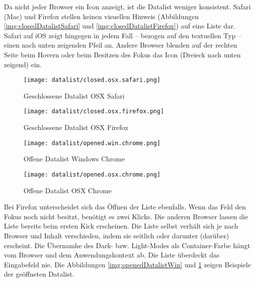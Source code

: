Da nicht jeder Browser ein Icon anzeigt, ist die Datalist weniger konsistent. 
Safari (Mac) und Firefox stellen keinen visuellen Hinweis (Abbildungen \ref{img:closedDatalistSafari} und \ref{img:closedDatalistFirefox}) auf eine Liste dar. 
Safari auf iOS zeigt hingegen in jedem Fall – bezogen auf den textuellen Typ – einen nach unten zeigenden Pfeil an. 
Andere Browser blenden auf der rechten Seite beim Hovern oder beim Besitzen des Fokus das Icon (Dreieck nach unten zeigend) ein. 

\begin{figure}[!htb]
    \centering
    \begin{minipage}[b]{0.25\textwidth}
        \centering
        \begin{minipage}[t]{\textwidth}
            \centering
            \texttt{[image: datalist/closed.osx.safari.png]}
            \caption{\centering Geschlossene Datalist OSX Safari}
            \label{img:closedDatalistSafari}
        \end{minipage}
        \vspace{0.6cm}\newline
        \begin{minipage}[b]{\textwidth}
            \centering
            \texttt{[image: datalist/closed.osx.firefox.png]}
            \caption{\centering Geschlossene Datalist OSX Firefox}
            \label{img:closedDatalistFirefox}
        \end{minipage}
    \end{minipage}
    \hfill
    \begin{minipage}[b]{0.37\textwidth}
        \centering
        \texttt{[image: datalist/opened.win.chrome.png]}
        \caption{\centering Offene Datalist Windows Chrome}
        \label{img:openedDatalistWin}
    \end{minipage}
    \hfill
    \begin{minipage}[b]{0.28\textwidth}
        \centering
        \texttt{[image: datalist/opened.osx.chrome.png]}
        \caption{\centering Offene Datalist OSX Chrome}
        \label{img:openedDatalistOsx}
    \end{minipage}
\end{figure}

Bei Firefox unterscheidet sich das Öffnen der Liste ebenfalls. 
Wenn das Feld den Fokus noch nicht besitzt, benötigt es zwei Klicks. 
Die anderen Browser lassen die Liste bereits beim ersten Kick erscheinen. 
Die Liste selbst verhält sich je nach Browser und Inhalt verschieden, indem sie seitlich oder darunter (darüber) erscheint. 
Die Übernamhe des Dark- bzw. Light-Modes als Container-Farbe hängt vom Browser und dem Anwendungskontext ab. 
Die Liste überdeckt das Eingabefeld nie. 
Die Abbildungen \ref{img:openedDatalistWin} und \ref{img:openedDatalistOsx} zeigen Beispiele der geöffneten Datalist. 

